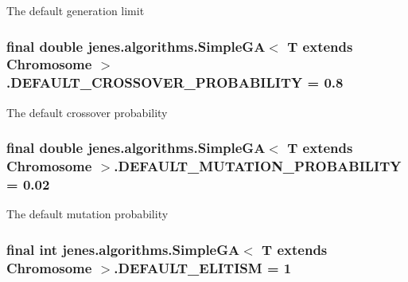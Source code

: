 The default generation limit \hypertarget{classjenes_1_1algorithms_1_1_simple_g_a_3_01_t_01extends_01_chromosome_01_4_6bb4783aa44abaae39375ae762412fa3}{
\subsubsection[DEFAULT\_\-CROSSOVER\_\-PROBABILITY]{\setlength{\rightskip}{0pt plus 5cm}final double jenes.algorithms.SimpleGA$<$ T extends Chromosome $>$.{\bf DEFAULT\_\-CROSSOVER\_\-PROBABILITY} = 0.8}}
\label{classjenes_1_1algorithms_1_1_simple_g_a_3_01_t_01extends_01_chromosome_01_4_6bb4783aa44abaae39375ae762412fa3}


The default crossover probability \hypertarget{classjenes_1_1algorithms_1_1_simple_g_a_3_01_t_01extends_01_chromosome_01_4_6b93f23c518016295e31b02aa7ef1f8c}{
\subsubsection[DEFAULT\_\-MUTATION\_\-PROBABILITY]{\setlength{\rightskip}{0pt plus 5cm}final double jenes.algorithms.SimpleGA$<$ T extends Chromosome $>$.{\bf DEFAULT\_\-MUTATION\_\-PROBABILITY} = 0.02}}
\label{classjenes_1_1algorithms_1_1_simple_g_a_3_01_t_01extends_01_chromosome_01_4_6b93f23c518016295e31b02aa7ef1f8c}


The default mutation probability \hypertarget{classjenes_1_1algorithms_1_1_simple_g_a_3_01_t_01extends_01_chromosome_01_4_3b820957538efb558e8240e996d503cd}{
\subsubsection[DEFAULT\_\-ELITISM]{\setlength{\rightskip}{0pt plus 5cm}final int jenes.algorithms.SimpleGA$<$ T extends Chromosome $>$.{\bf DEFAULT\_\-ELITISM} = 1}}
\label{classjenes_1_1algorithms_1_1_simple_g_a_3_01_t_01extends_01_chromosome_01_4_3b820957538efb558e8240e996d503cd}


